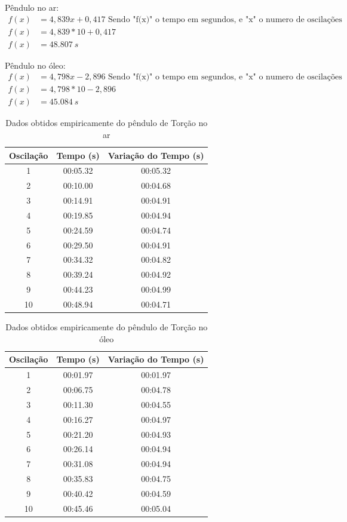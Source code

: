 Pêndulo no ar:
\begin{align*}
	f(x) &= 4,839x +  0,417 \text{ Sendo "f(x)" o tempo em segundos, e "x" o numero de oscilações} \\
 	f(x) &= 4,839 * 10 + 0,417\\
    f(x) &= \qty{48,807}{s}	
\end{align*}

Pêndulo no óleo:
\begin{align*}
	f(x) &= 4,798x -  2,896 \text{ Sendo "f(x)" o tempo em segundos, e "x" o numero de oscilações}\\
	f(x) &= 4,798 * 10 - 2,896\\
	f(x) &= \qty{45,084}{s}
\end{align*}

\begin{table}[H]
	\caption{Dados obtidos empiricamente do pêndulo de Torção no ar} \label{tabelaar}
	\begin{center}
		\begin{tabular}{c c c}
			\hline
			Oscilação & Tempo (s) & Variação do Tempo (s) \\
			\hline
			1 & 00:05.32 & 00:05.32\\
			2 & 00:10.00 & 00:04.68\\
			3 & 00:14.91 & 00:04.91\\
			4 & 00:19.85 & 00:04.94\\
			5 & 00:24.59 & 00:04.74\\
			6 & 00:29.50 & 00:04.91\\
			7 & 00:34.32 & 00:04.82\\
			8 & 00:39.24 & 00:04.92\\
			9 & 00:44.23 & 00:04.99\\
			10 & 00:48.94 & 00:04.71\\
			\hline
		\end{tabular}
	\end{center}
\end{table}

\begin{table}[H]
	\caption{Dados obtidos empiricamente do pêndulo de Torção no óleo} \label{tabelaóleo}
	\begin{center}
		\begin{tabular}{c c c}
			\hline
			Oscilação & Tempo (s) & Variação do Tempo (s) \\
			\hline
			1 & 00:01.97 & 00:01.97\\
			2 & 00:06.75 & 00:04.78\\
			3 & 00:11.30 & 00:04.55\\
			4 & 00:16.27 & 00:04.97\\
			5 & 00:21.20 & 00:04.93\\
			6 & 00:26.14 & 00:04.94\\
			7 & 00:31.08 & 00:04.94\\
			8 & 00:35.83 & 00:04.75\\
			9 & 00:40.42 & 00:04.59\\
			10 & 00:45.46 & 00:05.04\\
			\hline
		\end{tabular}
	\end{center}
\end{table}

